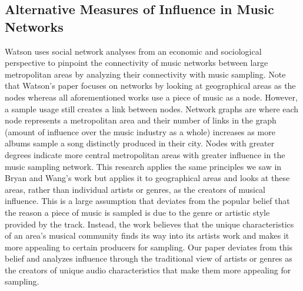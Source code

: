 \documentclass[pageno]{jpaper}
\begin{document}
\subsection{Alternative Measures of Influence in Music Networks}
Watson uses social network analyses from an economic and sociological perspective to pinpoint the connectivity of music networks between large metropolitan areas by analyzing their connectivity with music sampling. \cite{Watson} Note that Watson's paper focuses on networks by looking at geographical areas as the nodes whereas all aforementioned works use a piece of music as a node. However, a sample usage still creates a link between nodes. Network graphs are where each node represents a metropolitan area and their number of links in the graph (amount of influence over the music industry as a whole) increases as more albums sample a song distinctly produced in their city. Nodes with greater degrees indicate more central metropolitan areas with greater influence in the music sampling network. This research applies the same principles we saw in Bryan and Wang's work but applies it to geographical areas and looks at these areas, rather than individual artists or genres, as the creators of musical influence. This is a large assumption that deviates from the popular belief that the reason a piece of music is sampled is due to the genre or artistic style provided by the track. Instead, the work believes that the unique characteristics of an area's musical community finds its way into its artists work and makes it more appealing to certain producers for sampling. Our paper deviates from this belief and analyzes influence through the traditional view of artists or genres as the creators of unique audio characteristics that make them more appealing for sampling.
\end{document}
